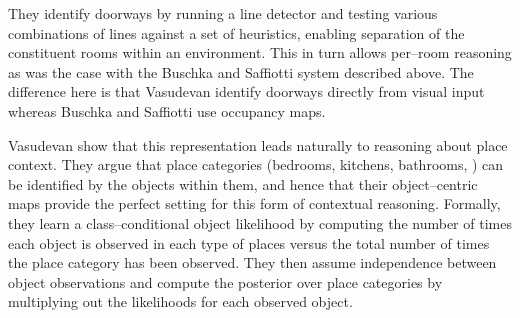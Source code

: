 They identify doorways by running a line detector and testing various
combinations of lines against a set of heuristics, enabling separation
of the constituent rooms within an environment. This in turn allows
per--room reasoning as was the case with the Buschka and Saffiotti
system described above. The difference here is that Vasudevan \etal
identify doorways directly from visual input whereas Buschka and
Saffiotti use occupancy maps.

Vasudevan \etal show that this representation leads naturally to
reasoning about place context. They argue that place categories
(bedrooms, kitchens, bathrooms, \etc) can be identified by the objects
within them, and hence that their object--centric maps provide the
perfect setting for this form of contextual reasoning. Formally, they
learn a class--conditional object likelihood by computing the number
of times each object is observed in each type of places versus the
total number of times the place category has been observed. They then
assume independence between object observations and compute the
posterior over place categories by multiplying out the likelihoods for
each observed object. 







